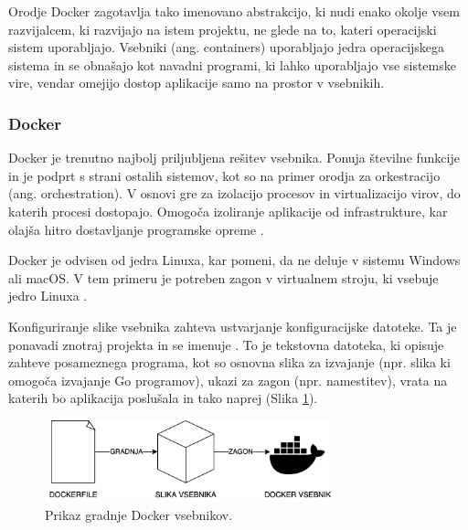 Orodje Docker zagotavlja tako imenovano abstrakcijo, ki nudi enako okolje vsem razvijalcem, ki razvijajo na istem projektu, ne glede na to, kateri operacijski sistem uporabljajo. Vsebniki (ang. containers) uporabljajo jedra operacijskega sistema in se obnašajo kot navadni programi, ki lahko uporabljajo vse sistemske vire, vendar omejijo dostop aplikacije samo na prostor v vsebnikih. 

\clearpage


\subsubsection{Docker}
\label{docker-section}
Docker je trenutno najbolj priljubljena rešitev vsebnika. Ponuja številne funkcije in je podprt s strani ostalih sistemov, kot so na primer orodja za orkestracijo (ang. orchestration). V osnovi gre za izolacijo procesov in virtualizacijo virov, do katerih procesi dostopajo. Omogoča izoliranje aplikacije od infrastrukture, kar olajša hitro dostavljanje programske opreme \cite{linuxcontainers}.

Docker je odvisen od jedra Linuxa, kar pomeni, da ne deluje v sistemu Windows ali macOS. V tem primeru je potreben zagon v virtualnem stroju, ki vsebuje jedro Linuxa \cite{docker-in-action}.

Konfiguriranje slike vsebnika zahteva ustvarjanje konfiguracijske datoteke. Ta je ponavadi znotraj projekta in se imenuje . To je tekstovna datoteka, ki opisuje zahteve posameznega programa, kot so osnovna slika za izvajanje (npr. slika ki omogoča izvajanje Go programov), ukazi za zagon (npr. namestitev), vrata na katerih bo aplikacija poslušala in tako naprej (Slika \ref{docker-flow}).

\begin{figure}[h]
\begin{center}
\includegraphics[width=0.75\textwidth]{slike/docker-flow.png}
\end{center}
\caption{ Prikaz gradnje Docker vsebnikov. }
\label{docker-flow}
\end{figure}

